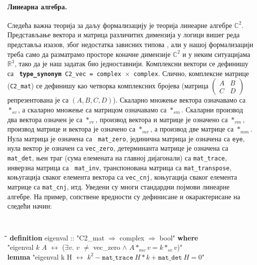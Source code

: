 \paragraph{Линеарна алгебра.}
Следећа важна теорија за даљу формализацију је теорија линеарне
алгебре $\mathbb{C}^2$.  Представљање вектора и матрица различитих
димензија у логици вишег реда представља изазов, због недостатка
зависних типова \cite{harrison05}, али у нашој формализацији треба
само да разматрамо просторе коначне димензије $\mathbb{C}^2$ и у неким
ситуацијама $\mathbb{R}^3$, тако да је наш задатак био
једноставнији. Комплексни вектори се дефинишу са {\tt \textbf{
    type\_synonym} C2\_vec = complex $\times$ complex}. Слично,
комплексне матрице ({\tt C2\_mat}) се дефинишу као четворка
комплексних бројева (матрица $\left(\begin{array}{cc}A & B\\C &
  D\end{array}\right)$ репрезентована је са $(A, B, C, D)$). Скаларно
  множење вектора означавамо са $*_{sv}$, а скаларно множење са
  матрицом означавамо са $*_{sm}$. Скаларни производ два вектора
  означен је са $*_{vv}$, производ вектора и матрице је означено са
  $*_{vm}$, производ матрице и вектора је означено са $*_{mv}$, а
  производ две матрице са $*_{mm}$. Нула матрица је означена са {\tt
    mat\_zero}, јединична матрица је означена са {\tt eye}, нула
  вектор је означен са {\tt vec\_zero}, детерминанта матрице је
  означена са \mbox{{\tt mat\_det}}, њен траг (сума елемената на
  главној дијагонали) са {\tt mat\_trace}, инверзна матрица са {\tt
    mat\_inv}, транспонована матрица са {\tt mat\_transpose},
  коњугација сваког елемента вектора са {\tt vec\_cnj}, коњугација
  сваког елемента матрице са {\tt mat\_cnj}, итд. Уведени су многи
  стандардни појмови линеарне алгебре. На пример, сопствене вредности
  су дефинисане и окарактерисане на следећи начин:
   {\tt
  \begin{tabbing}
    \hspace{5mm}\=\hspace{5mm}\=\hspace{5mm}\=\hspace{5mm}\=\hspace{5mm}\=\kill
\textbf{definition} eigenval :: "C2\_mat $\Rightarrow$ complex $\Rightarrow$ bool" \textbf{where}\\
\>"eigenval $k$ $A$ $\longleftrightarrow$ ($\exists v.$ $v$ $\neq$ vec\_zero $\wedge$ $A *_{mv} v = k *_{sv} v$)"\\
\textbf{lemma} "eigenval k H $\longleftrightarrow$ $k^2 - \mathtt{mat\_trace}\ H * k + \mathtt{mat\_det}\ H = 0$"
  \end{tabbing}
}
